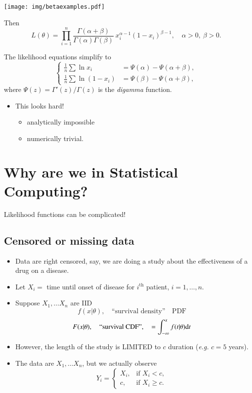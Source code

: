 \documentclass[captions=tableheading]{scrbook}
\begin{document}
\begin{itemize}
\begin{center}

\texttt{[image: img/betaexamples.pdf]}

\end{center}

Then 
\[
L(\theta) = \prod_{i=1}^{n}\frac{\Gamma(\alpha+\beta)}{\Gamma(\alpha)\Gamma(\beta)}\: x_{i}^{\alpha-1}(1-x_{i})^{\beta-1}, \quad \alpha > 0,\ \beta > 0.
\]

The likelihood equations simplify to
\[
\begin{cases}
\frac{1}{n}\sum\ln x_{i} & =\Psi(\alpha)-\Psi(\alpha+\beta),\\
\frac{1}{n}\sum\ln(1-x_{i}) & =\Psi(\beta)-\Psi(\alpha+\beta),
\end{cases}
\]
where $\Psi(z)=\Gamma'(z)/\Gamma(z)$ is the \emph{digamma} function.


\begin{itemize}
\item This looks hard!
\begin{itemize}
\item analytically impossible
\item numerically trivial.
\end{itemize}
\end{itemize}

\end{itemize} %
\section{Why are we in Statistical Computing?}
\label{sec-1_2}


Likelihood functions can be complicated!
\subsection{Censored or missing data}
\label{sec-1_2_1}



\begin{itemize}
\item Data are right censored, say, we are doing a study  about the effectiveness of a drug on a disease.
\item Let \(X_{i} =\) time until onset of disease for \(i^{\mathrm{th}}\) patient, \(i=1,\ldots,n\).
\item Suppose \(X_{1},\ldots X_{n}\) are IID
   \[
   f(x|\theta),\quad \mbox{``survival density''}\quad \mathrm{PDF}
   \]
   \[
   F(x|\theta),\quad \mbox{``survival CDF''},\quad =\int_{-\infty}^{x}f(t|\theta)\mathrm{d} t
   \]
\item However, the length of the study is LIMITED to $c$ duration (\emph{e.g.} $c=5$ years).
\item The data are  \(X_{1},\ldots X_{n}\), but we actually observe
  \[
  Y_{i}=
  \begin{cases}
  X_{i}, & \mbox{if }X_{i}<c,\\
  c, & \mbox{if }X_{i}\geq c.
  \end{cases}
  \]
\end{itemize}
\end{document}
